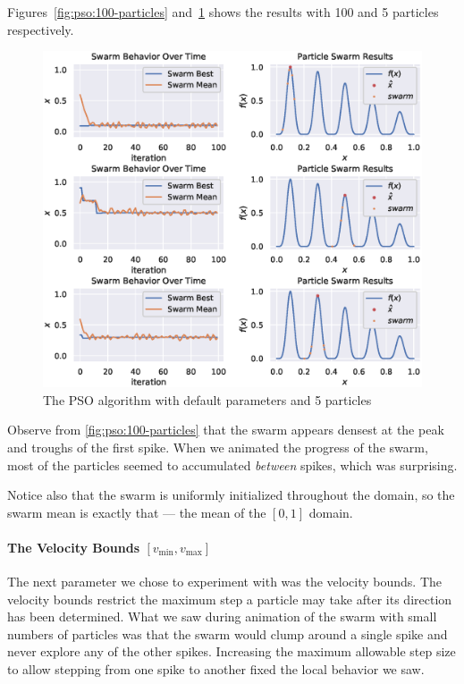 \documentclass[12pt]{article}
\begin{document}
Figures~\ref{fig:pso:100-particles} and~\ref{fig:pso:5-particles} shows the results with 100 and 5 particles respectively.

\begin{figure}[H]
    \centering
    \includegraphics[width=\textwidth]{figures/pso-5-particles.eps}
    \caption{The PSO algorithm with default parameters and 5 particles}\label{fig:pso:5-particles}
\end{figure}

Observe from \autoref{fig:pso:100-particles} that the swarm appears densest at the peak and troughs of the first spike.
When we animated the progress of the swarm, most of the particles seemed to accumulated \textit{between} spikes, which was surprising.

Notice also that the swarm is uniformly initialized throughout the domain, so the swarm mean is exactly that --- the mean of the $[0, 1]$ domain.

\paragraph{The Velocity Bounds $[v_{\min}, v_{\max}]$} The next parameter we chose to experiment with was the velocity bounds.
The velocity bounds restrict the maximum step a particle may take after its direction has been determined.
What we saw during animation of the swarm with small numbers of particles was that the swarm would clump around a single spike and never explore any of the other spikes.
Increasing the maximum allowable step size to allow stepping from one spike to another fixed the local behavior we saw.
\end{document}
